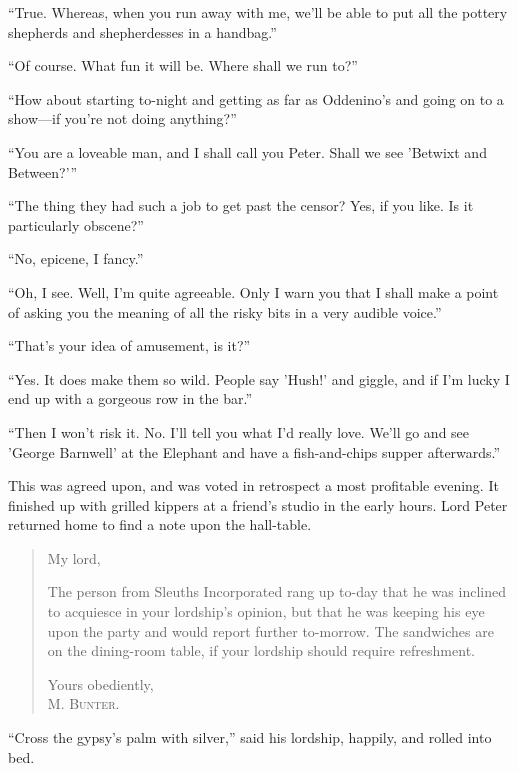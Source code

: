 \enquote{True. Whereas, when you run away with me, we'll be able to put all the pottery shepherds and shepherdesses in a handbag.}

\enquote{Of course. What fun it will be. Where shall we run to?}

\enquote{How about starting to-night and getting as far as Oddenino's and going on to a show\allowbreak---\allowbreak if you're not doing anything?}

\enquote{You are a loveable man, and I shall call you Peter. Shall we see 'Betwixt and Between?'}

\enquote{The thing they had such a job to get past the censor? Yes, if you like. Is it particularly obscene?}

\enquote{No, epicene, I fancy.}

\enquote{Oh, I see. Well, I'm quite agreeable. Only I warn you that I shall make a point of asking you the meaning of all the risky bits in a very audible voice.}

\enquote{That's your idea of amusement, is it?}

\enquote{Yes. It does make them so wild. People say 'Hush!' and giggle, and if I'm lucky I end up with a gorgeous row in the bar.}

\enquote{Then I won't risk it. No. I'll tell you what I'd really love. We'll go and see 'George Barnwell' at the Elephant and have a fish-and-chips supper afterwards.}

This was agreed upon, and was voted in retrospect a most profitable evening. It finished up with grilled kippers at a friend's studio in the early hours. Lord Peter returned home to find a note upon the hall-table.
\begin{quote}
\noindent My lord,

The person from Sleuths Incorporated rang up to-day that he was inclined to acquiesce in your lordship's opinion, but that he was keeping his eye upon the party and would report further to-morrow. The sandwiches are on the dining-room table, if your lordship should require refreshment.

\begin{flushright}
Yours obediently,\\
\textsc{M. Bunter.}
\end{flushright}
\end{quote}

\enquote{Cross the gypsy's palm with silver,} said his lordship, happily, and rolled into bed.